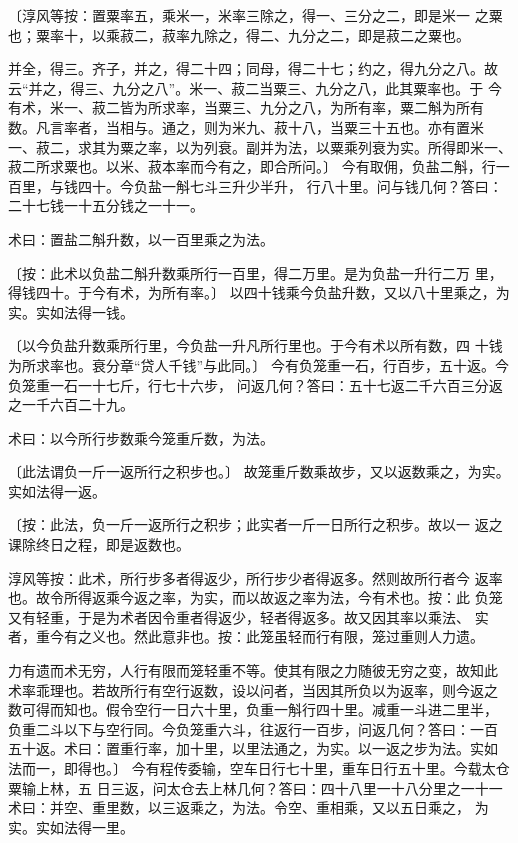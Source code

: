 \documentclass[12pt,UTF8]{ctexbook}
\begin{document}
〔淳风等按：置粟率五，乘米一，米率三除之，得一、三分之二，即是米一 之粟也；粟率十，以乘菽二，菽率九除之，得二、九分之二，即是菽二之粟也。

并全，得三。齐子，并之，得二十四；同母，得二十七；约之，得九分之八。故 云“并之，得三、九分之八”。米一、菽二当粟三、九分之八，此其粟率也。于 今有术，米一、菽二皆为所求率，当粟三、九分之八，为所有率，粟二斛为所有 数。凡言率者，当相与。通之，则为米九、菽十八，当粟三十五也。亦有置米 一、菽二，求其为粟之率，以为列衰。副并为法，以粟乘列衰为实。所得即米一、 菽二所求粟也。以米、菽本率而今有之，即合所问。〕 今有取佣，负盐二斛，行一百里，与钱四十。今负盐一斛七斗三升少半升， 行八十里。问与钱几何？答曰：二十七钱一十五分钱之一十一。

术曰：置盐二斛升数，以一百里乘之为法。

〔按：此术以负盐二斛升数乘所行一百里，得二万里。是为负盐一升行二万 里，得钱四十。于今有术，为所有率。〕 以四十钱乘今负盐升数，又以八十里乘之，为实。实如法得一钱。

〔以今负盐升数乘所行里，今负盐一升凡所行里也。于今有术以所有数，四 十钱为所求率也。衰分章“贷人千钱”与此同。〕 今有负笼重一石，行百步，五十返。今负笼重一石一十七斤，行七十六步， 问返几何？答曰：五十七返二千六百三分返之一千六百二十九。

术曰：以今所行步数乘今笼重斤数，为法。

〔此法谓负一斤一返所行之积步也。〕 故笼重斤数乘故步，又以返数乘之，为实。实如法得一返。

〔按：此法，负一斤一返所行之积步；此实者一斤一日所行之积步。故以一 返之课除终日之程，即是返数也。

淳风等按：此术，所行步多者得返少，所行步少者得返多。然则故所行者今 返率也。故令所得返乘今返之率，为实，而以故返之率为法，今有术也。按：此 负笼又有轻重，于是为术者因令重者得返少，轻者得返多。故又因其率以乘法、 实者，重今有之义也。然此意非也。按：此笼虽轻而行有限，笼过重则人力遗。

力有遗而术无穷，人行有限而笼轻重不等。使其有限之力随彼无穷之变，故知此 术率乖理也。若故所行有空行返数，设以问者，当因其所负以为返率，则今返之 数可得而知也。假令空行一日六十里，负重一斛行四十里。减重一斗进二里半， 负重二斗以下与空行同。今负笼重六斗，往返行一百步，问返几何？答曰：一百 五十返。术曰：置重行率，加十里，以里法通之，为实。以一返之步为法。实如 法而一，即得也。〕 今有程传委输，空车日行七十里，重车日行五十里。今载太仓粟输上林，五 日三返，问太仓去上林几何？答曰：四十八里一十八分里之一十一 术曰：并空、重里数，以三返乘之，为法。令空、重相乘，又以五日乘之， 为实。实如法得一里。
\end{document}
